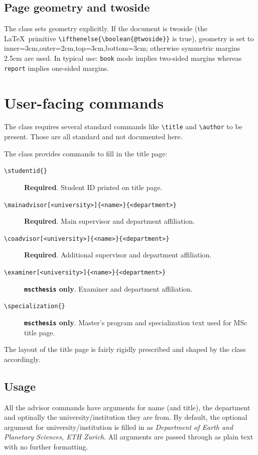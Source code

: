 \documentclass[11pt]{article}
\begin{document}
\subsection{Page geometry and twoside}
The class sets geometry explicitly. If the document is twoside (the \LaTeX\ primitive 
\verb|\ifthenelse{\boolean{@twoside}}| is true), geometry is set to inner=3cm,outer=2cm,top=3cm,bottom=3cm; 
otherwise symmetric margins 2.5cm are used. In typical use: \texttt{book} mode implies two-sided margins 
whereas \texttt{report} implies one-sided margins.

\section{User-facing commands}

The class requires several standard commands like \texttt{\textbackslash title} and \texttt{\textbackslash author}
to be present. Those are all standard and not documented here.

The class provides commands to fill in the title page:
\begin{description}
  \item[\texttt{\textbackslash studentid\{\}}] \textbf{Required}. Student ID printed on title page.
  \item[\texttt{\textbackslash mainadvisor[<university>]\{<name>\}\{<department>\}}] \textbf{Required}. Main supervisor 
    and department affiliation.
  \item[\texttt{\textbackslash coadvisor[<university>]\{<name>\}\{<department>\}}] \textbf{Required}. Additional 
    supervisor and department affiliation.
  \item[\texttt{\textbackslash examiner[<university>]\{<name>\}\{<department>\}}] \textbf{\texttt{mscthesis} only}. 
    Examiner and department affiliation.
  \item[\texttt{\textbackslash specialization\{\}}] \textbf{\texttt{mscthesis} only}. Master's program and 
    specialization text used for MSc title page.
\end{description}

The layout of the title page is fairly rigidly prescribed and shaped by the class accordingly.

\subsection{Usage}

All the advisor commands have arguments for name (and title), the department and optinally the university/institution
they are from. By default, the optional argument for university/institution is filled in as
\emph{Department of Earth and Planetary Sciences, ETH Zurich}. 
All arguments are passed through as plain text with no further formatting. 
\end{document}
